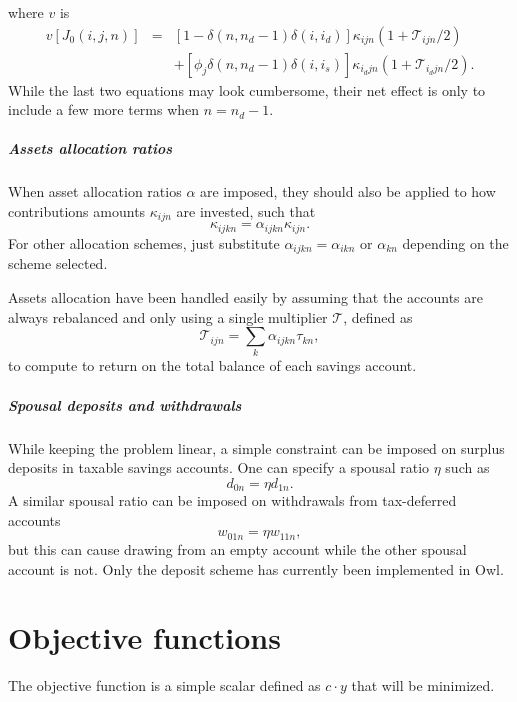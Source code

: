 \documentclass{report}[fleqn,12pt]
\begin{document}
where $v$ is
\begin{eqnarray}
	v[J_0(i, j, n)] 
	&=& [1 - \delta(n, n_d-1)\delta(i, i_d)] \kappa_{ijn}(1 + \mathcal{T}_{ijn}/2)
	\nonumber \\
	&& + [\phi_j\delta(n, n_d-1)\delta(i, i_s)]\kappa_{i_djn}(1 + \mathcal{T}_{i_djn}/2). 
\end{eqnarray}
While the last two equations may look cumbersome, their net effect is only to include
a few more terms when $n=n_d-1$. 

\paragraph*{Assets allocation ratios}
When asset allocation ratios $\alpha$ are imposed,
they should also be applied to how
contributions amounts $\kappa_{ijn}$ are invested, such that 
\begin{equation}
	\kappa_{ijkn} = \alpha_{ijkn} \kappa_{ijn}.
\end{equation}
For other allocation schemes, just substitute $\alpha_{ijkn} = \alpha_{ikn}$ or $\alpha_{kn}$
depending on the scheme selected.

Assets allocation have been handled easily by assuming that
the accounts are always rebalanced
and only using a single multiplier $\mathcal{T}$, defined as
\begin{equation}
	\mathcal{T}_{ijn} = \sum_k \alpha_{ijkn}\tau_{kn},
\end{equation}
to compute to return
on the total balance of each savings account.

\paragraph*{Spousal deposits and withdrawals}
While keeping the problem linear, a simple constraint can be imposed on
surplus deposits in taxable savings accounts. One can specify a spousal ratio $\eta$
such as
\begin{equation}
	d_{0n} = \eta d_{1n}.
\end{equation}
A similar spousal ratio can be imposed on withdrawals from tax-deferred accounts
\begin{equation}
	w_{01n} = \eta w_{11n},
\end{equation}
but this can cause drawing from an empty account while the other spousal account is not.
Only the deposit scheme has currently been implemented in Owl.

\chapter{Objective functions}
The objective function is a simple scalar defined as $c\cdot y$ that will be minimized.
\end{document}
